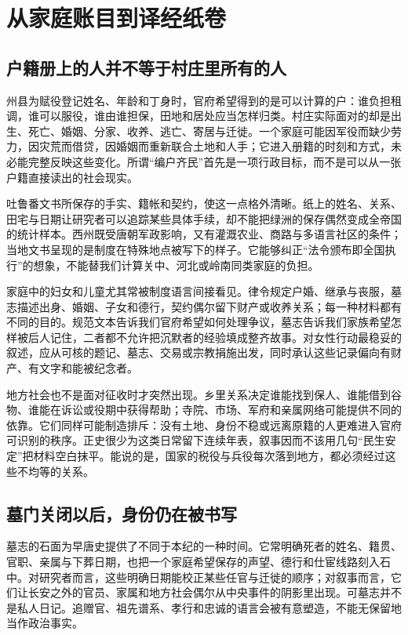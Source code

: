 \section{从家庭账目到译经纸卷}
\label{sec:early-tang-acceptance-scenes-three}

\subsection{户籍册上的人并不等于村庄里所有的人}
州县为赋役登记姓名、年龄和丁身时，官府希望得到的是可以计算的户：谁负担租调，谁可以服役，谁由谁担保，田地和居处应当怎样归类。村庄实际面对的却是出生、死亡、婚姻、分家、收养、逃亡、寄居与迁徙。一个家庭可能因军役而缺少劳力，因灾荒而借贷，因婚姻而重新联合土地和人手；它进入册籍的时刻和方式，未必能完整反映这些变化。所谓“编户齐民”首先是一项行政目标，而不是可以从一张户籍直接读出的社会现实。

吐鲁番文书所保存的手实、籍帐和契约，使这一点格外清晰。纸上的姓名、关系、田宅与日期让研究者可以追踪某些具体手续，却不能把绿洲的保存偶然变成全帝国的统计样本。西州既受唐朝军政影响，又有灌溉农业、商路与多语言社区的条件；当地文书呈现的是制度在特殊地点被写下的样子。它能够纠正“法令颁布即全国执行”的想象，不能替我们计算关中、河北或岭南同类家庭的负担。

家庭中的妇女和儿童尤其常被制度语言间接看见。律令规定户婚、继承与丧服，墓志描述出身、婚姻、子女和德行，契约偶尔留下财产或收养关系；每一种材料都有不同的目的。规范文本告诉我们官府希望如何处理争议，墓志告诉我们家族希望怎样被后人记住，二者都不允许把沉默者的经验填成整齐故事。对女性行动最稳妥的叙述，应从可核的题记、墓志、交易或宗教捐施出发，同时承认这些记录偏向有财产、有文字和能被纪念者。

地方社会也不是面对征收时才突然出现。乡里关系决定谁能找到保人、谁能借到谷物、谁能在诉讼或役期中获得帮助；寺院、市场、军府和亲属网络可能提供不同的依靠。它们同样可能制造排斥：没有土地、身份不稳或远离原籍的人更难进入官府可识别的秩序。正史很少为这类日常留下连续年表，叙事因而不该用几句“民生安定”把材料空白抹平。能说的是，国家的税役与兵役每次落到地方，都必须经过这些不均等的关系。

\subsection{墓门关闭以后，身份仍在被书写}
墓志的石面为早唐史提供了不同于本纪的一种时间。它常明确死者的姓名、籍贯、官职、亲属与下葬日期，也把一个家庭希望保存的声望、德行和仕宦线路刻入石中。对研究者而言，这些明确日期能校正某些任官与迁徙的顺序；对叙事而言，它们让长安之外的官员、家属和地方社会偶尔从中央事件的阴影里出现。可墓志并不是私人日记。追赠官、祖先谱系、孝行和忠诚的语言会被有意塑造，不能无保留地当作政治事实。

